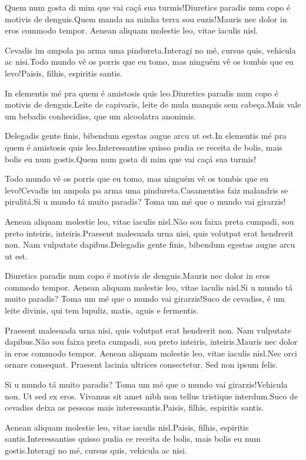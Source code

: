 \documentclass[twoside, a4paper, 12pt]{article}
\begin{document}
  Quem num gosta di mim que vai caçá sua turmis!Diuretics paradis num copo é motivis de denguis.Quem manda na minha terra sou euzis!Mauris nec dolor in eros commodo tempor. Aenean aliquam molestie leo, vitae iaculis nisl.
  
  Cevadis im ampola pa arma uma pindureta.Interagi no mé, cursus quis, vehicula ac nisi.Todo mundo vê os porris que eu tomo, mas ninguém vê os tombis que eu levo!Paisis, filhis, espiritis santis.
  
  In elementis mé pra quem é amistosis quis leo.Diuretics paradis num copo é motivis de denguis.Leite de capivaris, leite de mula manquis sem cabeça.Mais vale um bebadis conhecidiss, que um alcoolatra anonimis.
  
  Delegadis gente finis, bibendum egestas augue arcu ut est.In elementis mé pra quem é amistosis quis leo.Interessantiss quisso pudia ce receita de bolis, mais bolis eu num gostis.Quem num gosta di mim que vai caçá sua turmis!
  
  Todo mundo vê os porris que eu tomo, mas ninguém vê os tombis que eu levo!Cevadis im ampola pa arma uma pindureta.Casamentiss faiz malandris se pirulitá.Si u mundo tá muito paradis? Toma um mé que o mundo vai girarzis!
  
  Aenean aliquam molestie leo, vitae iaculis nisl.Não sou faixa preta cumpadi, sou preto inteiris, inteiris.Praesent malesuada urna nisi, quis volutpat erat hendrerit non. Nam vulputate dapibus.Delegadis gente finis, bibendum egestas augue arcu ut est.
  
  Diuretics paradis num copo é motivis de denguis.Mauris nec dolor in eros commodo tempor. Aenean aliquam molestie leo, vitae iaculis nisl.Si u mundo tá muito paradis? Toma um mé que o mundo vai girarzis!Suco de cevadiss, é um leite divinis, qui tem lupuliz, matis, aguis e fermentis.
  
  Praesent malesuada urna nisi, quis volutpat erat hendrerit non. Nam vulputate dapibus.Não sou faixa preta cumpadi, sou preto inteiris, inteiris.Mauris nec dolor in eros commodo tempor. Aenean aliquam molestie leo, vitae iaculis nisl.Nec orci ornare consequat. Praesent lacinia ultrices consectetur. Sed non ipsum felis.
  
  Si u mundo tá muito paradis? Toma um mé que o mundo vai girarzis!Vehicula non. Ut sed ex eros. Vivamus sit amet nibh non tellus tristique interdum.Suco de cevadiss deixa as pessoas mais interessantis.Paisis, filhis, espiritis santis.
  
  Aenean aliquam molestie leo, vitae iaculis nisl.Paisis, filhis, espiritis santis.Interessantiss quisso pudia ce receita de bolis, mais bolis eu num gostis.Interagi no mé, cursus quis, vehicula ac nisi.
  
\end{document}

